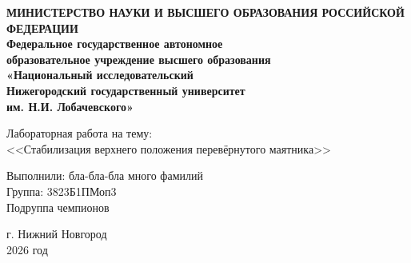 \begin{titlepage}
	\begin{center}
		\textbf{МИНИСТЕРСТВО НАУКИ И ВЫСШЕГО ОБРАЗОВАНИЯ РОССИЙСКОЙ ФЕДЕРАЦИИ} \\
		\textbf{Федеральное государственное автономное} \\
		\textbf{образовательное учреждение высшего образования} \\
		\textbf{«Национальный исследовательский} \\
		\textbf{Нижегородский государственный университет} \\
		\textbf{им. Н.И. Лобачевского»} \\
		
		\vspace{2cm}
		
		\LARGE Лабораторная работа на тему: \\
		\LARGE {<<Стабилизация верхнего положения перевёрнутого маятника>>} \\
		
		\vspace{10cm}
		
		\begin{flushright}
			\normalsize Выполнили: бла-бла-бла много фамилий \\
			\normalsize Группа: 3823Б1ПМоп3 \\
			\normalsize Подруппа чемпионов\\
		\end{flushright}
		
		\vfill
		
		\normalsize г. Нижний Новгород \\
		\normalsize 2026 год
	\end{center}
\end{titlepage}
